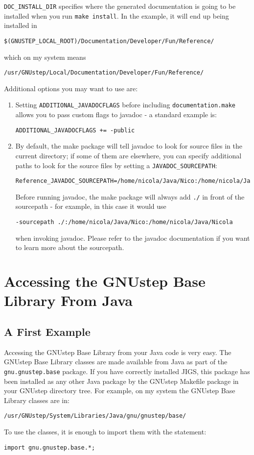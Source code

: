 \texttt{DOC\_INSTALL\_DIR} specifies where the generated documentation 
is going to be installed when you run \texttt{make install}.  In the
example, it will end up being installed in 
\begin{verbatim}
$(GNUSTEP_LOCAL_ROOT)/Documentation/Developer/Fun/Reference/
\end{verbatim}%
which on my system means
\begin{verbatim}
/usr/GNUstep/Local/Documentation/Developer/Fun/Reference/
\end{verbatim}
Additional options you may want to use are: 
\begin{enumerate}
\item Setting \texttt{ADDITIONAL\_JAVADOCFLAGS} before including 
\texttt{documentation.make} allows you to pass custom 
flags to javadoc - a standard example is:
\begin{verbatim}
ADDITIONAL_JAVADOCFLAGS += -public
\end{verbatim}
\item By default, the make package will tell javadoc to look for source 
files in the current directory; if some of them are elsewhere, you can
specify additional paths to look for the source files by setting a
\texttt{JAVADOC\_SOURCEPATH}:
\begin{verbatim}
Reference_JAVADOC_SOURCEPATH=/home/nicola/Java/Nico:/home/nicola/Java/Nicola
\end{verbatim}
Before running javadoc, the make package will always add \texttt{./} in 
front of the sourcepath - for example, in this case it would use 
\begin{verbatim}
-sourcepath ./:/home/nicola/Java/Nico:/home/nicola/Java/Nicola
\end{verbatim}
when invoking javadoc.  Please refer to the javadoc documentation if
you want to learn more about the sourcepath.
\end{enumerate}

\section{Accessing the GNUstep Base Library From Java}

\subsection{A First Example}

Accessing the GNUstep Base Library from your Java code is very easy.
The GNUstep Base Library classes are made available from Java as part
of the \texttt{gnu.gnustep.base} package.  If you have correctly
installed JIGS, this package has been installed as any other Java
package by the GNUstep Makefile package in your GNUstep directory
tree.  For example, on my system the GNUstep Base Library classes are
in:
\begin{verbatim}
/usr/GNUstep/System/Libraries/Java/gnu/gnustep/base/
\end{verbatim}
To use the classes, it is enough to import them with the statement:
\begin{verbatim}
import gnu.gnustep.base.*;
\end{verbatim}


